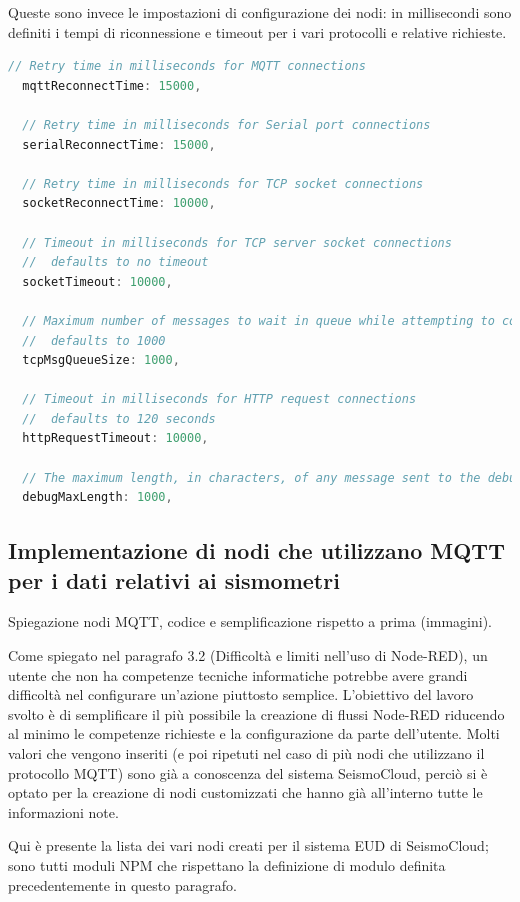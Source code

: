 \documentclass[a4paper,10pt]{memoir}
\begin{document}
Queste sono invece le impostazioni di configurazione dei nodi:
in millisecondi sono definiti i tempi di riconnessione e timeout per i vari protocolli e relative richieste.
\begin{lstlisting}[language=Javascript]
  // Retry time in milliseconds for MQTT connections
  mqttReconnectTime: 15000,

  // Retry time in milliseconds for Serial port connections
  serialReconnectTime: 15000,

  // Retry time in milliseconds for TCP socket connections
  socketReconnectTime: 10000,

  // Timeout in milliseconds for TCP server socket connections
  //  defaults to no timeout
  socketTimeout: 10000,

  // Maximum number of messages to wait in queue while attempting to connect to TCP socket
  //  defaults to 1000
  tcpMsgQueueSize: 1000,

  // Timeout in milliseconds for HTTP request connections
  //  defaults to 120 seconds
  httpRequestTimeout: 10000,

  // The maximum length, in characters, of any message sent to the debug sidebar tab
  debugMaxLength: 1000,
\end{lstlisting}

\subsection{Implementazione di nodi che utilizzano MQTT per i dati relativi ai sismometri}

Spiegazione nodi MQTT, codice e semplificazione rispetto a prima (immagini).

Come spiegato nel paragrafo 3.2 (Difficoltà e limiti nell'uso di Node-RED), un utente che non ha competenze tecniche informatiche potrebbe avere grandi difficoltà nel configurare un'azione piuttosto semplice.
L'obiettivo del lavoro svolto è di semplificare il più possibile la creazione di flussi Node-RED riducendo al minimo le competenze richieste e la configurazione da parte dell'utente.
Molti valori che vengono inseriti (e poi ripetuti nel caso di più nodi che utilizzano il protocollo MQTT) sono già a conoscenza del sistema SeismoCloud, perciò si è optato per la creazione di nodi customizzati che hanno già all'interno tutte le informazioni note.

Qui è presente la lista dei vari nodi creati per il sistema EUD di SeismoCloud; sono tutti moduli NPM che rispettano la definizione di modulo definita precedentemente in questo paragrafo.
\end{document}
